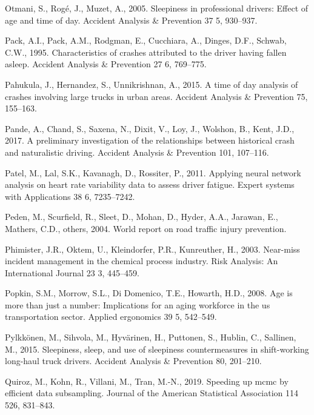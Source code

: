 \documentclass[12pt]{book}
\numberwithin{equation}{chapter}
\begin{document}
\leavevmode\hypertarget{ref-otmani2005sleepiness}{}%
Otmani, S., Rogé, J., Muzet, A., 2005. Sleepiness in professional drivers: Effect of age and time of day. Accident Analysis \& Prevention 37 5, 930--937.

\leavevmode\hypertarget{ref-pack1995characteristics}{}%
Pack, A.I., Pack, A.M., Rodgman, E., Cucchiara, A., Dinges, D.F., Schwab, C.W., 1995. Characteristics of crashes attributed to the driver having fallen asleep. Accident Analysis \& Prevention 27 6, 769--775.

\leavevmode\hypertarget{ref-pahukula2015time}{}%
Pahukula, J., Hernandez, S., Unnikrishnan, A., 2015. A time of day analysis of crashes involving large trucks in urban areas. Accident Analysis \& Prevention 75, 155--163.

\leavevmode\hypertarget{ref-pande2017preliminary}{}%
Pande, A., Chand, S., Saxena, N., Dixit, V., Loy, J., Wolshon, B., Kent, J.D., 2017. A preliminary investigation of the relationships between historical crash and naturalistic driving. Accident Analysis \& Prevention 101, 107--116.

\leavevmode\hypertarget{ref-patel2011applying}{}%
Patel, M., Lal, S.K., Kavanagh, D., Rossiter, P., 2011. Applying neural network analysis on heart rate variability data to assess driver fatigue. Expert systems with Applications 38 6, 7235--7242.

\leavevmode\hypertarget{ref-peden2004world}{}%
Peden, M., Scurfield, R., Sleet, D., Mohan, D., Hyder, A.A., Jarawan, E., Mathers, C.D., others, 2004. World report on road traffic injury prevention.

\leavevmode\hypertarget{ref-phimister2003near}{}%
Phimister, J.R., Oktem, U., Kleindorfer, P.R., Kunreuther, H., 2003. Near-miss incident management in the chemical process industry. Risk Analysis: An International Journal 23 3, 445--459.

\leavevmode\hypertarget{ref-popkin2008age}{}%
Popkin, S.M., Morrow, S.L., Di Domenico, T.E., Howarth, H.D., 2008. Age is more than just a number: Implications for an aging workforce in the us transportation sector. Applied ergonomics 39 5, 542--549.

\leavevmode\hypertarget{ref-pylkkonen2015sleepiness}{}%
Pylkkönen, M., Sihvola, M., Hyvärinen, H., Puttonen, S., Hublin, C., Sallinen, M., 2015. Sleepiness, sleep, and use of sleepiness countermeasures in shift-working long-haul truck drivers. Accident Analysis \& Prevention 80, 201--210.

\leavevmode\hypertarget{ref-quiroz2019speeding}{}%
Quiroz, M., Kohn, R., Villani, M., Tran, M.-N., 2019. Speeding up mcmc by efficient data subsampling. Journal of the American Statistical Association 114 526, 831--843.
\end{document}
